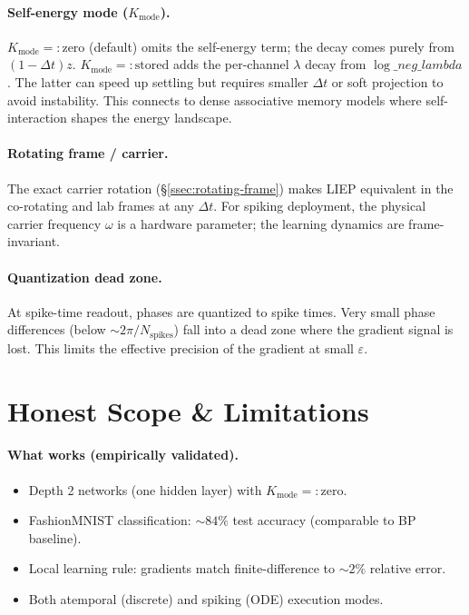 \documentclass[11pt]{article}
\newcommand{\dt}{\Delta t}
\begin{document}
\paragraph{Self-energy mode ($K_{\text{mode}}$).}
$K_{\text{mode}}=:\text{zero}$ (default) omits the self-energy term; the decay comes purely from $(1-\dt)z$. $K_{\text{mode}}=:\text{stored}$ adds the per-channel $\lambda$ decay from $\log\_neg\_lambda$. The latter can speed up settling but requires smaller $\dt$ or soft projection to avoid instability. This connects to dense associative memory models \citep{krotov2016dense} where self-interaction shapes the energy landscape.

\paragraph{Rotating frame / carrier.}
The exact carrier rotation (§\ref{ssec:rotating-frame}) makes LIEP equivalent in the co-rotating and lab frames at any $\dt$. For spiking deployment, the physical carrier frequency $\omega$ is a hardware parameter; the learning dynamics are frame-invariant.

\paragraph{Quantization dead zone.}
At spike-time readout, phases are quantized to spike times. Very small phase differences (below $\sim 2\pi / N_{\text{spikes}}$) fall into a dead zone where the gradient signal is lost. This limits the effective precision of the gradient at small $\varepsilon$.

\section{Honest Scope \& Limitations}\label{sec:scope}

\paragraph{What works (empirically validated).}
\begin{itemize}
\item Depth 2 networks (one hidden layer) with $K_{\text{mode}}=:\text{zero}$.
\item FashionMNIST classification: $\sim 84\%$ test accuracy (comparable to BP baseline).
\item Local learning rule: gradients match finite-difference to $\sim 2\%$ relative error.
\item Both atemporal (discrete) and spiking (ODE) execution modes.
\end{itemize}
\end{document}
